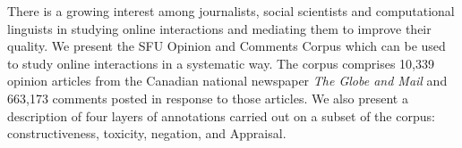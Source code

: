There is a growing interest among journalists, social scientists and computational linguists in studying online interactions and mediating them to improve their quality. We present the SFU Opinion and Comments Corpus which can be used to study online interactions in a systematic way. The corpus comprises 10,339 opinion articles from the Canadian national newspaper \textit{The Globe and Mail} and 663,173 comments posted in response to those articles. We also present a description of four layers of annotations carried out on a subset of the corpus: constructiveness, toxicity, negation, and Appraisal.
